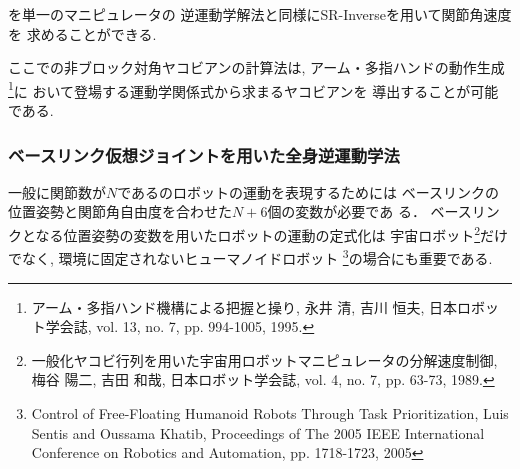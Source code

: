 を単一のマニピュレータの
逆運動学解法と同様にSR-Inverseを用いて関節角速度を
求めることができる.

ここでの非ブロック対角ヤコビアンの計算法は,
アーム・多指ハンドの動作生成
\footnote{
アーム・多指ハンド機構による把握と操り, 永井 清, 吉川 恒夫,
日本ロボット学会誌, vol. 13, no. 7, pp. 994-1005, 1995.
}に
おいて登場する運動学関係式から求まるヤコビアンを
導出することが可能である.

\subsubsection{ベースリンク仮想ジョイントを用いた全身逆運動学法}
一般に関節数が$N$であるのロボットの運動を表現するためには
ベースリンクの位置姿勢と関節角自由度を合わせた$N+6$個の変数が必要であ
る．
ベースリンクとなる位置姿勢の変数を用いたロボットの運動の定式化は
宇宙ロボット\footnote{
一般化ヤコビ行列を用いた宇宙用ロボットマニピュレータの分解速度制御,
梅谷 陽二, 吉田 和哉,
日本ロボット学会誌, vol. 4, no. 7, pp. 63-73, 1989.
}だけでなく,
環境に固定されないヒューマノイドロボット
\footnote{
Control of Free-Floating Humanoid Robots Through Task Prioritization,
Luis Sentis and Oussama Khatib,
Proceedings of The 2005 IEEE International Conference on Robotics and Automation,
pp. 1718-1723, 2005
}の場合にも重要である.

